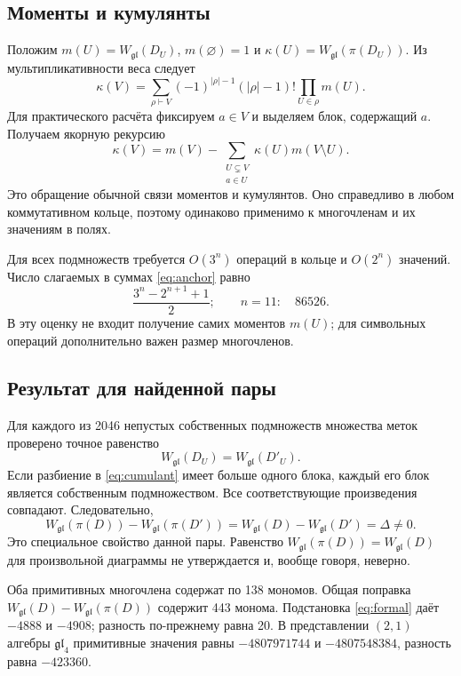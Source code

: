 \documentclass[11pt,a4paper]{article}
\numberwithin{equation}{section}
\theoremstyle{definition}
\theoremstyle{remark}
\newcommand{\gl}{\mathfrak{gl}}
\newcommand{\W}{W_{\gl}}
\begin{document}
\subsection{Моменты и кумулянты}

Положим $m(U)=\W(D_U)$, $m(\varnothing)=1$ и
$\kappa(U)=\W(\pi(D_U))$. Из мультипликативности веса следует
\begin{equation}\label{eq:cumulant}
 \kappa(V)=\sum_{\rho\vdash V}(-1)^{|\rho|-1}(|\rho|-1)!
 \prod_{U\in\rho}m(U).
\end{equation}
Для практического расчёта фиксируем $a\in V$ и выделяем блок,
содержащий $a$. Получаем якорную рекурсию
\begin{equation}\label{eq:anchor}
 \kappa(V)=m(V)-\sum_{\substack{U\subsetneq V\\a\in U}}
 \kappa(U)m(V\setminus U).
\end{equation}
Это обращение обычной связи моментов и кумулянтов. Оно справедливо в любом
коммутативном кольце, поэтому одинаково применимо к многочленам и их
значениям в полях.

Для всех подмножеств требуется $O(3^n)$ операций в кольце и $O(2^n)$
значений. Число слагаемых в суммах \eqref{eq:anchor} равно
\[
 \frac{3^n-2^{n+1}+1}{2};\qquad n=11:\quad86526.
\]
В эту оценку не входит получение самих моментов $m(U)$; для символьных
операций дополнительно важен размер многочленов.

\subsection{Результат для найденной пары}

Для каждого из 2046 непустых собственных подмножеств множества меток
проверено точное равенство
\[
 \W(D_U)=\W(D'_U).
\]
Если разбиение в \eqref{eq:cumulant} имеет больше одного блока,
каждый его блок является собственным подмножеством. Все соответствующие
произведения совпадают. Следовательно,
\begin{equation}\label{eq:primitive-difference}
 \W(\pi(D))-\W(\pi(D'))=\W(D)-\W(D')=\Delta\ne0.
\end{equation}
Это специальное свойство данной пары. Равенство $\W(\pi(D))=\W(D)$
для произвольной диаграммы не утверждается и, вообще говоря, неверно.

Оба примитивных многочлена содержат по 138 мономов. Общая поправка
$\W(D)-\W(\pi(D))$ содержит 443 монома. Подстановка \eqref{eq:formal}
даёт $-4888$ и $-4908$; разность по-прежнему равна 20.
В представлении $(2,1)$ алгебры $\gl_4$ примитивные значения равны
$-4807971744$ и $-4807548384$, разность равна $-423360$.
\end{document}
